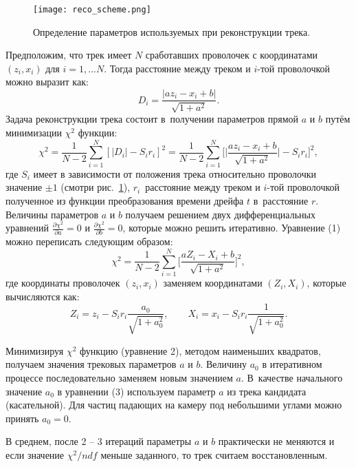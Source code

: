 \begin{figure}[h]
  \begin{center}
    \texttt{[image: reco\_scheme.png]}
    \caption {Определение параметров используемых при реконструкции трека.}
    \label{fig:reco_scheme}
  \end{center}
\end{figure}

Предположим, что трек имеет $N$ сработавших проволочек с координатами
$(z_{i}, x_{i})$ для $i = 1, \ldots N$. Тогда расстояние между треком и $i$-той
проволочкой можно выразит как:
\[
D_{i} = \frac{|a z_{i} - x_{i} + b|}{\sqrt{1 + a^{2}}}.
\]
Задача реконструкции трека состоит в~получении параметров прямой $a$ и $b$
путём минимизации $\chi^2$ функции:
\begin{equation}
\chi^2 = \frac{1}{N-2}\sum_{i=1}^{N} [|D_i| -S_ir_i]^2 =
\frac{1}{N-2}\sum_{i=1}^{N} \biggl[
\Big|\frac{az_i - x_i + b}{\sqrt{1 + a^2}}\Big| - S_ir_i\biggr]^2,
\end{equation}
где $S_i$ имеет в зависимости от положения трека относительно проволочки
значение $\pm{1}$ (смотри рис.~\ref{fig:reco_scheme}),
$r_i$~расстояние между треком и $i$-той проволочкой полученное из функции
преобразования времени дрейфа $t$ в~расстояние $r$. Величины параметров
$a$ и $b$ получаем решением двух дифференциальных уравнений
$\frac{\partial \chi^2}{\partial a} = 0$ и
$\frac{\partial \chi^2}{\partial b} = 0$, которые можно решить итеративно.
Уравнение (1) можно переписать следующим образом:
\begin{equation}
\chi^2 = \frac{1}{N-2}\sum_{i=1}^{N}
\biggl[\frac{aZ_i - X_i + b}{\sqrt{1 + a^2}}\biggr]^2,
\end{equation}
где координаты проволочек $(z_{i}, x_{i})$ заменяем координатами
$(Z_{i}, X_{i})$, которые вычисляются как:
\begin{equation}
Z_i = z_i - S_ir_i \frac{a_0}{\sqrt{1 + a_0^2}}, \qquad
X_i = x_i - S_ir_i \frac{1}{\sqrt{1 + a_0^2}}.
\end{equation}

Минимизируя $\chi^2$ функцию (уравнение 2), методом наименьших квадратов,
получаем значения трековых параметров $a$ и $b$. Величину $a_{0}$ в итеративном
процессе последовательно заменяем новым значением $a$. В~качестве начального
значение $a_{0}$ в уравнении (3) используем параметр $a$ из трека кандидата
(касательной). Для частиц падающих на камеру под небольшими углами можно
принять $a_{0} = 0$.

В среднем, после 2 -- 3 итераций параметры $a$ и $b$ практически не меняются
и если значение $\chi^2/ndf$  меньше заданного, то трек считаем восстановленным.

